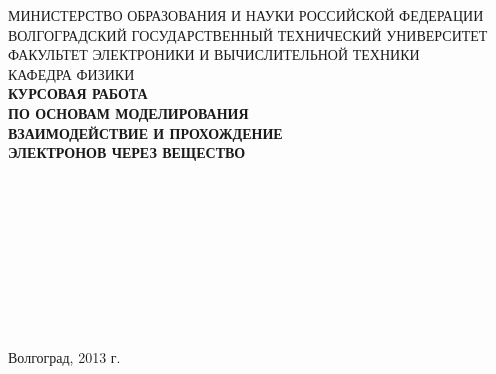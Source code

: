 
\begin{titlepage}

\begin{center}
\normalsize
МИНИСТЕРСТВО ОБРАЗОВАНИЯ И НАУКИ РОССИЙСКОЙ ФЕДЕРАЦИИ\\
ВОЛГОГРАДСКИЙ ГОСУДАРСТВЕННЫЙ ТЕХНИЧЕСКИЙ УНИВЕРСИТЕТ\\
ФАКУЛЬТЕТ ЭЛЕКТРОНИКИ И ВЫЧИСЛИТЕЛЬНОЙ ТЕХНИКИ\\
КАФЕДРА ФИЗИКИ\\[5cm]
\Large
\bf
КУРСОВАЯ РАБОТА \\ ПО ОСНОВАМ МОДЕЛИРОВАНИЯ\\
ВЗАИМОДЕЙСТВИЕ И ПРОХОЖДЕНИЕ\\ ЭЛЕКТРОНОВ ЧЕРЕЗ ВЕЩЕСТВО\\[3cm]
\end{center}

\hfill\parbox{6cm}{
\\
\\
\\
\\
\\
\\
\\}
\begin{center}
\\[2.75cm]
Волгоград, 2013 г.\\
\end{center}

\end{titlepage}
 

